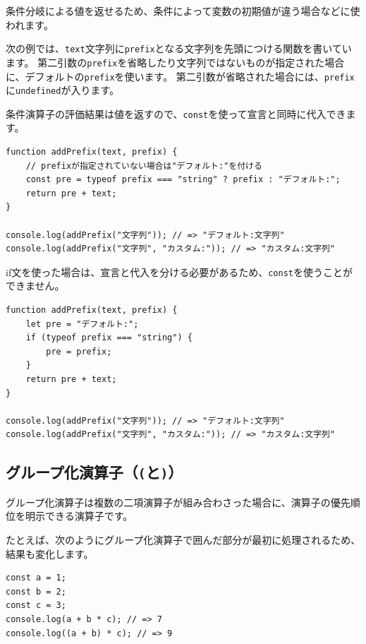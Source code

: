 条件分岐による値を返せるため、条件によって変数の初期値が違う場合などに使われます。

次の例では、\texttt{text}文字列に\texttt{prefix}となる文字列を先頭につける関数を書いています。
第二引数の\texttt{prefix}を省略したり文字列ではないものが指定された場合に、デフォルトの\texttt{prefix}を使います。
第二引数が省略された場合には、\texttt{prefix}に\texttt{undefined}が入ります。

条件演算子の評価結果は値を返すので、\texttt{const}を使って宣言と同時に代入できます。

\begin{lstlisting}
function addPrefix(text, prefix) {
    // prefixが指定されていない場合は"デフォルト:"を付ける
    const pre = typeof prefix === "string" ? prefix : "デフォルト:";
    return pre + text;
}

console.log(addPrefix("文字列")); // => "デフォルト:文字列"
console.log(addPrefix("文字列", "カスタム:")); // => "カスタム:文字列"
\end{lstlisting}

if文を使った場合は、宣言と代入を分ける必要があるため、\texttt{const}を使うことができません。

\begin{lstlisting}
function addPrefix(text, prefix) {
    let pre = "デフォルト:";
    if (typeof prefix === "string") {
        pre = prefix;
    }
    return pre + text;
}

console.log(addPrefix("文字列")); // => "デフォルト:文字列"
console.log(addPrefix("文字列", "カスタム:")); // => "カスタム:文字列"
\end{lstlisting}


\hypertarget{group-operator}{%
\subsection{\texorpdfstring{グループ化演算子（\texttt{(}と\texttt{)}）}{グループ化演算子（(と)）}}\label{group-operator}}

グループ化演算子は複数の二項演算子が組み合わさった場合に、演算子の優先順位を明示できる演算子です。

たとえば、次のようにグループ化演算子で囲んだ部分が最初に処理されるため、結果も変化します。

\begin{lstlisting}
const a = 1;
const b = 2;
const c = 3;
console.log(a + b * c); // => 7
console.log((a + b) * c); // => 9
\end{lstlisting}

